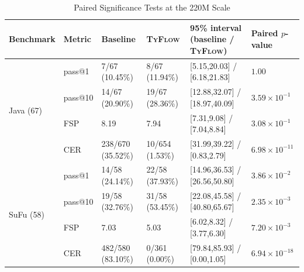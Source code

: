 \documentclass[manuscript,screen]{acmart}
\newcommand{\toolname}[1]{\textsc{#1}}
\newcommand{\mainname}{\toolname{TyFlow}\xspace}
\begin{document}
\begin{table}[ht]
\centering
\begin{threeparttable}
\caption{{\color{revblue}Paired Significance Tests at the 220M Scale}}
\label{tab:paired-statistics-220m}
\begin{tabular}{l l l l l l}
\toprule
{\color{revblue}Benchmark }& {\color{revblue}Metric }& {\color{revblue}Baseline }& \mainname & {\color{revblue}95\% interval (baseline / }\mainname{\color{revblue}) }& {\color{revblue}Paired $p$-value }\\
\midrule
\multirow{4}{*}{Java (67)}
 & {\color{revblue}pass@1  }& {\color{revblue}7/67 (10.45\%)  }& {\color{revblue}8/67 (11.94\%)  }& [{\color{revblue}5.15,20.03}] {\color{revblue}/ }[{\color{revblue}6.18,21.83}]   & {\color{revblue}$1.00$ }\\
 & {\color{revblue}pass@10 }& {\color{revblue}14/67 (20.90\%) }& {\color{revblue}19/67 (28.36\%) }& [{\color{revblue}12.88,32.07}] {\color{revblue}/ }[{\color{revblue}18.97,40.09}] & {\color{revblue}$3.59{\times}10^{-1}$ }\\
 & {\color{revblue}FSP     }& {\color{revblue}8.19            }& {\color{revblue}7.94            }& [{\color{revblue}7.31,9.08}] {\color{revblue}/ }[{\color{revblue}7.04,8.84}]      & {\color{revblue}$3.08{\times}10^{-1}$ }\\
 & {\color{revblue}CER     }& {\color{revblue}238/670 (35.52\%) }& {\color{revblue}10/654 (1.53\%)  }& [{\color{revblue}31.99,39.22}] {\color{revblue}/ }[{\color{revblue}0.83,2.79}] & {\color{revblue}$6.98{\times}10^{-11}$ }\\
\midrule
\multirow{4}{*}{SuFu (58)}
 & {\color{revblue}pass@1  }& {\color{revblue}14/58 (24.14\%)  }& {\color{revblue}22/58 (37.93\%)  }& [{\color{revblue}14.96,36.53}] {\color{revblue}/ }[{\color{revblue}26.56,50.80}] & {\color{revblue}$3.86{\times}10^{-2}$ }\\
 & {\color{revblue}pass@10 }& {\color{revblue}19/58 (32.76\%) }& {\color{revblue}31/58 (53.45\%) }& [{\color{revblue}22.08,45.58}] {\color{revblue}/ }[{\color{revblue}40.80,65.67}] & {\color{revblue}$2.35{\times}10^{-3}$ }\\
 & {\color{revblue}FSP     }& {\color{revblue}7.03             }& {\color{revblue}5.03             }& [{\color{revblue}6.02,8.32}] {\color{revblue}/ }[{\color{revblue}3.77,6.30}]      & {\color{revblue}$7.20{\times}10^{-3}$ }\\
 & {\color{revblue}CER     }& {\color{revblue}482/580 (83.10\%) }& {\color{revblue}0/361 (0.00\%)   }& [{\color{revblue}79.84,85.93}] {\color{revblue}/ }[{\color{revblue}0.00,1.05}]    & {\color{revblue}$6.94{\times}10^{-18}$ }\\
\bottomrule
\end{tabular}
\end{threeparttable}
\end{table}
\end{document}
